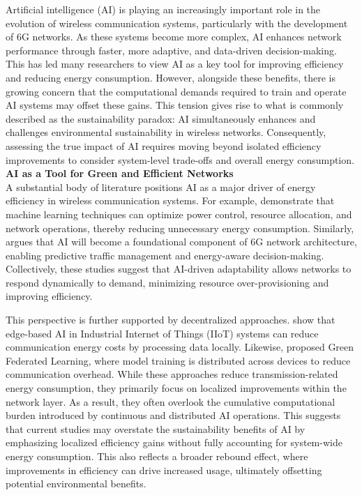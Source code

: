 \documentclass[letterpaper]{article} %
\begin{document}
Artificial intelligence (AI) is playing an increasingly important role in the evolution of wireless communication systems, particularly with the development of 6G networks. As these systems become more complex, AI enhances network performance through faster, more adaptive, and data-driven decision-making. This has led many researchers to view AI as a key tool for improving efficiency and reducing energy consumption. However, alongside these benefits, there is growing concern that the computational demands required to train and operate AI systems may offset these gains. This tension gives rise to what is commonly described as the sustainability paradox: AI simultaneously enhances and challenges environmental sustainability in wireless networks. Consequently, assessing the true impact of AI requires moving beyond isolated efficiency improvements to consider system-level trade-offs and overall energy consumption.\\

\textbf{AI as a Tool for Green and Efficient Networks}\\

A substantial body of literature positions AI as a major driver of energy efficiency in wireless communication systems. For example, \cite{mao_ai_2022} demonstrate that machine learning techniques can optimize power control, resource allocation, and network operations, thereby reducing unnecessary energy consumption. Similarly, \cite{cui_role_2025} argues that AI will become a foundational component of 6G network architecture, enabling predictive traffic management and energy-aware decision-making. Collectively, these studies suggest that AI-driven adaptability allows networks to respond dynamically to demand, minimizing resource over-provisioning and improving efficiency.

This perspective is further supported by decentralized approaches.\cite{fernando_energy-efficient_2024} show that edge-based AI in Industrial Internet of Things (IIoT) systems can reduce communication energy costs by processing data locally. Likewise, \cite{yousefpour_green_2023} proposed Green Federated Learning, where model training is distributed across devices to reduce communication overhead. While these approaches reduce transmission-related energy consumption, they primarily focus on localized improvements within the network layer. As a result, they often overlook the cumulative computational burden introduced by continuous and distributed AI operations. This suggests that current studies may overstate the sustainability benefits of AI by emphasizing localized efficiency gains without fully accounting for system-wide energy consumption. This also reflects a broader rebound effect, where improvements in efficiency can drive increased usage, ultimately offsetting potential environmental benefits.\\
\end{document}
